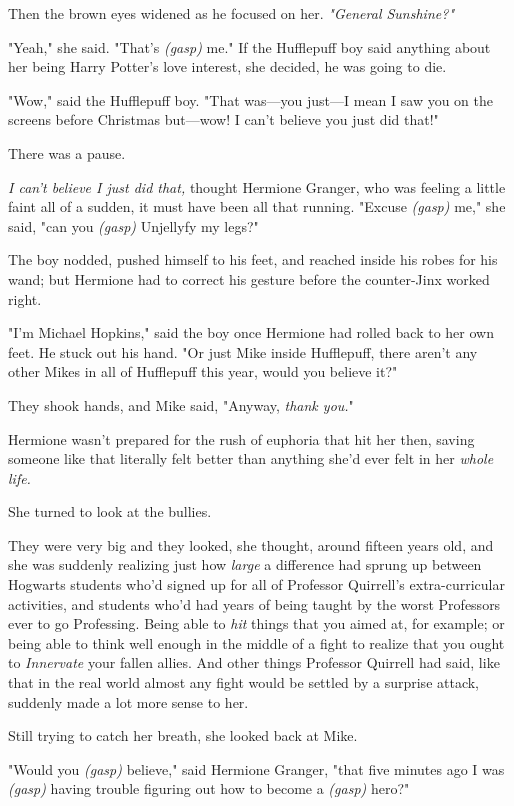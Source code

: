 Then the brown eyes widened as he focused on her. \emph{"General Sunshine?"}

"Yeah," she said. "That's \emph{(gasp)} me." If the Hufflepuff boy said
anything about her being Harry Potter's love interest, she decided, he was
going to die.

"Wow," said the Hufflepuff boy. "That was---you just---I mean I saw you on the
screens before Christmas but---wow! I can't believe you just did that!"

There was a pause.

\emph{I can't believe I just did that,} thought Hermione Granger, who was
feeling a little faint all of a sudden, it must have been all that running.
"Excuse \emph{(gasp)} me," she said, "can you \emph{(gasp)} Unjellyfy my legs?"

The boy nodded, pushed himself to his feet, and reached inside his robes for
his wand; but Hermione had to correct his gesture before the counter-Jinx
worked right.

"I'm Michael Hopkins," said the boy once Hermione had rolled back to her own
feet. He stuck out his hand. "Or just Mike inside Hufflepuff, there aren't any
other Mikes in all of Hufflepuff this year, would you believe it?"

They shook hands, and Mike said, "Anyway, \emph{thank you.}"

Hermione wasn't prepared for the rush of euphoria that hit her then, saving
someone like that literally felt better than anything she'd ever felt in her
\emph{whole life.}

She turned to look at the bullies.

They were very big and they looked, she thought, around fifteen years old, and
she was suddenly realizing just how \emph{large} a difference had sprung up
between Hogwarts students who'd signed up for all of Professor Quirrell's
extra-curricular activities, and students who'd had years of being taught by
the worst Professors ever to go Professing. Being able to \emph{hit} things
that you aimed at, for example; or being able to think well enough in the
middle of a fight to realize that you ought to \emph{Innervate} your fallen
allies. And other things Professor Quirrell had said, like that in the real
world almost any fight would be settled by a surprise attack, suddenly made a
lot more sense to her.

Still trying to catch her breath, she looked back at Mike.

"Would you \emph{(gasp)} believe," said Hermione Granger, "that five minutes
ago I was \emph{(gasp)} having trouble figuring out how to become a
\emph{(gasp)} hero?"

